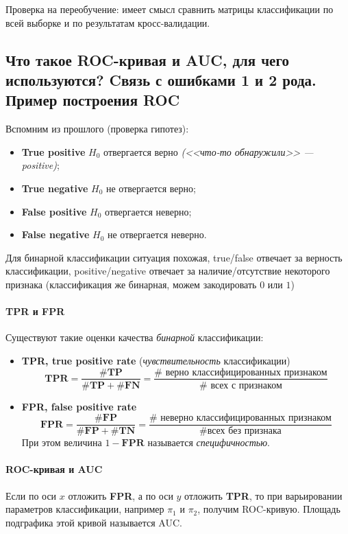 \documentclass[12pt,a4paper,final]{article}
\newcommand{\1}{\mathds{1}}
\begin{document}
Проверка на переобучение: имеет смысл сравнить матрицы классификации по всей выборке и по результатам кросс-валидации.


\subsection{Что такое ROC-кривая и AUC, для чего используются? Cвязь с ошибками 1 и 2 рода. Пример построения ROC}

Вспомним из прошлого (проверка гипотез):
\begin{itemize}
\item \textbf{True positive} $H_0$ отвергается верно \textit{(<<что-то обнаружили>> --- positive)};
\item \textbf{True negative} $H_0$ не отвергается верно;
\item \textbf{False positive} $H_0$ отвергается неверно; 
\item \textbf{False negative} $H_0$ не отвергается неверно.
\end{itemize}
Для бинарной классификации ситуация похожая, true/false отвечает за верность классификации, positive/negative отвечает за наличие/отсутствие некоторого признака (классификация же бинарная, можем закодировать $0$ или $1$)

\paragraph{TPR и FPR} Существуют такие оценки качества \textit{бинарной} классификации:
\begin{itemize}
\item \textbf{TPR, true positive rate} (\textit{чувствительность} классификации)
$$\mathbf{TPR} =\frac{\#\mathbf{TP}}{\#\mathbf{TP} + \#\mathbf{FN}} =\frac{\# \text{ верно классифицированных признаком}}{\# \text{ всех с признаком}}$$
\item \textbf{FPR, false positive rate}
$$\mathbf{FPR} =\frac{\#\mathbf{FP}}{\#\mathbf{FP} + \#\mathbf{TN}} =\frac{\# \text{ неверно классифицированных признаком}}{\# \text{всех без признака}}$$
При этом величина $1 - \mathbf{FPR}$ называется \textit{специфичностью}.
\end{itemize}

\paragraph{ROC-кривая и AUC} Если по оси $x$ отложить \textbf{FPR}, а по оси $y$ отложить \textbf{TPR}, то при варьировании параметров классификации, например $\pi_1$ и $\pi_2$, получим ROC-кривую. Площадь подграфика этой кривой называется AUC.
\end{document}
